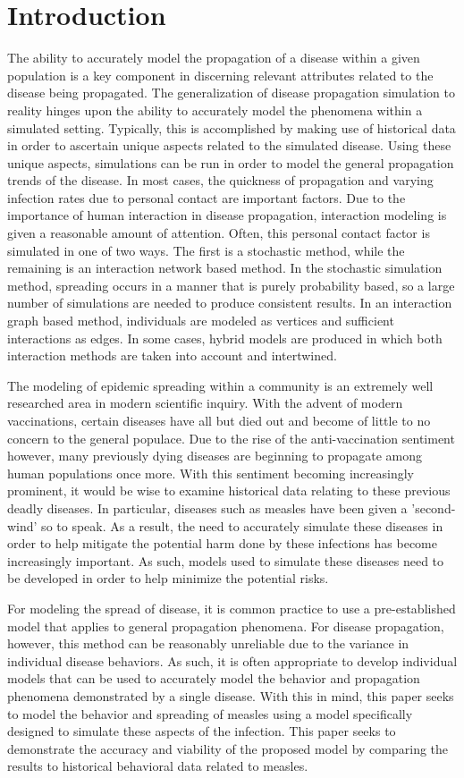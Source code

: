 \documentclass[conference]{IEEEtran}
\begin{document}
\section{Introduction} %
The ability to accurately model the propagation of a disease within a given population is a key component in discerning relevant attributes related to the disease being propagated. The generalization of disease propagation simulation to reality hinges upon the ability to accurately model the phenomena within a simulated setting. Typically, this is accomplished by making use of historical data in order to ascertain unique aspects related to the simulated disease. Using these unique aspects, simulations can be run in order to model the general propagation trends of the disease. In most cases, the quickness of propagation and varying infection rates due to personal contact are important factors. Due to the importance of human interaction in disease propagation, interaction modeling is given a reasonable amount of attention. Often, this personal contact factor is simulated in one of two ways. The first is a stochastic method, while the remaining is an interaction network based method. In the stochastic simulation method, spreading occurs in a manner that is purely probability based, so a large number of simulations are needed to produce consistent results. In an interaction graph based method, individuals are modeled as vertices and sufficient interactions as edges. In some cases, hybrid models are produced in which both interaction methods are taken into account and intertwined.\par
The modeling of epidemic spreading within a community is an extremely well researched area in modern scientific inquiry. With the advent of modern vaccinations, certain diseases have all but died out and become of little to no concern to the general populace. Due to the rise of the anti-vaccination sentiment however, many previously dying diseases are beginning to propagate among human populations once more. With this sentiment becoming increasingly prominent, it would be wise to examine historical data relating to these previous deadly diseases. In particular, diseases such as measles have been given a 'second-wind' so to speak. As a result, the need to accurately simulate these diseases in order to help mitigate the potential harm done by these infections has become increasingly important. As such, models used to simulate these diseases need to be developed in order to help minimize the potential risks.\par
For modeling the spread of disease, it is common practice to use a pre-established model that applies to general propagation phenomena. For disease propagation, however, this method can be reasonably unreliable due to the variance in individual disease behaviors. As such, it is often appropriate to develop individual models that can be used to accurately model the behavior and propagation phenomena demonstrated by a single disease. With this in mind, this paper seeks to model the behavior and spreading of measles using a model specifically designed to simulate these aspects of the infection. This paper seeks to demonstrate the accuracy and viability of the proposed model by comparing the results to historical behavioral data related to measles. 
\end{document}
